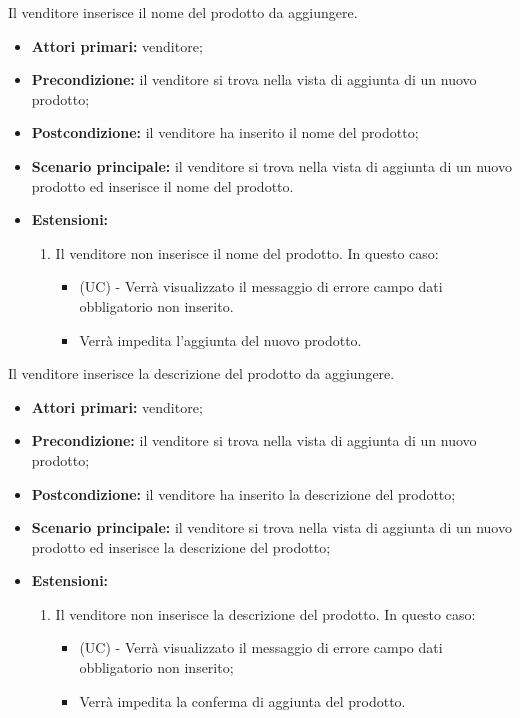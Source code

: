 \resetSubUC
{}
Il venditore inserisce il nome del prodotto da aggiungere.
\begin{itemize}
    \item \textbf{Attori primari:} venditore;
    \item \textbf{Precondizione:} il venditore si trova nella vista di aggiunta di un nuovo prodotto;
    \item \textbf{Postcondizione:} il venditore ha inserito il nome del prodotto;
    \item \textbf{Scenario principale:} il venditore si trova nella vista di aggiunta di un nuovo prodotto ed inserisce il nome del prodotto.
    \item \textbf{Estensioni:} 
    \begin{enumerate}
    	\item Il venditore non inserisce il nome del prodotto. In questo caso:
	    \begin{itemize}
	        \item (UC) - Verrà visualizzato il messaggio di errore campo dati obbligatorio non inserito.
	        \item Verrà impedita l'aggiunta del nuovo prodotto.
	    \end{itemize}
	\end{enumerate}
\end{itemize}

Il venditore inserisce la descrizione del prodotto da aggiungere.
\begin{itemize}
    \item \textbf{Attori primari:} venditore;
    \item \textbf{Precondizione:} il venditore si trova nella vista di aggiunta di un nuovo prodotto;
    \item \textbf{Postcondizione:} il venditore ha inserito la descrizione del prodotto;
    \item \textbf{Scenario principale:} il venditore si trova nella vista di aggiunta di un nuovo prodotto ed inserisce la descrizione del prodotto;
    \item \textbf{Estensioni:}
    \begin{enumerate}
    	\item Il venditore non inserisce la descrizione del prodotto. In questo caso:
    	\begin{itemize}
    		\item (UC) - Verrà visualizzato il messaggio di errore campo dati obbligatorio non inserito;
    		\item Verrà impedita la conferma di aggiunta del prodotto.
    	\end{itemize}
    \end{enumerate}
\end{itemize}

